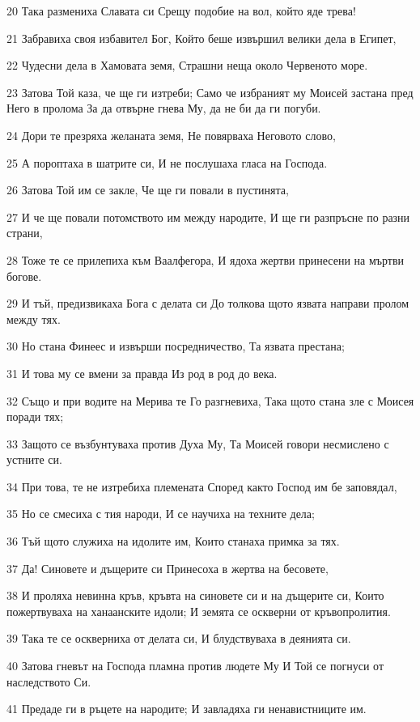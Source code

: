 \par 20 Така размениха Славата си Срещу подобие на вол, който яде трева!
\par 21 Забравиха своя избавител Бог, Който беше извършил велики дела в Египет,
\par 22 Чудесни дела в Хамовата земя, Страшни неща около Червеното море.
\par 23 Затова Той каза, че ще ги изтреби; Само че избраният му Моисей застана пред Него в пролома За да отвърне гнева Му, да не би да ги погуби.
\par 24 Дори те презряха желаната земя, Не повярваха Неговото слово,
\par 25 А пороптаха в шатрите си, И не послушаха гласа на Господа.
\par 26 Затова Той им се закле, Че ще ги повали в пустинята,
\par 27 И че ще повали потомството им между народите, И ще ги разпръсне по разни страни,
\par 28 Тоже те се прилепиха към Ваалфегора, И ядоха жертви принесени на мъртви богове.
\par 29 И тъй, предизвикаха Бога с делата си До толкова щото язвата направи пролом между тях.
\par 30 Но стана Финеес и извърши посредничество, Та язвата престана;
\par 31 И това му се вмени за правда Из род в род до века.
\par 32 Също и при водите на Мерива те Го разгневиха, Така щото стана зле с Моисея поради тях;
\par 33 Защото се възбунтуваха против Духа Му, Та Моисей говори несмислено с устните си.
\par 34 При това, те не изтребиха племената Според както Господ им бе заповядал,
\par 35 Но се смесиха с тия народи, И се научиха на техните дела;
\par 36 Тъй щото служиха на идолите им, Които станаха примка за тях.
\par 37 Да! Синовете и дъщерите си Принесоха в жертва на бесовете,
\par 38 И проляха невинна кръв, кръвта на синовете си и на дъщерите си, Които пожертвуваха на ханаанските идоли; И земята се оскверни от кръвопролития.
\par 39 Така те се оскверниха от делата си, И блудствуваха в деянията си.
\par 40 Затова гневът на Господа пламна против людете Му И Той се погнуси от наследството Си.
\par 41 Предаде ги в ръцете на народите; И завладяха ги ненавистниците им.

